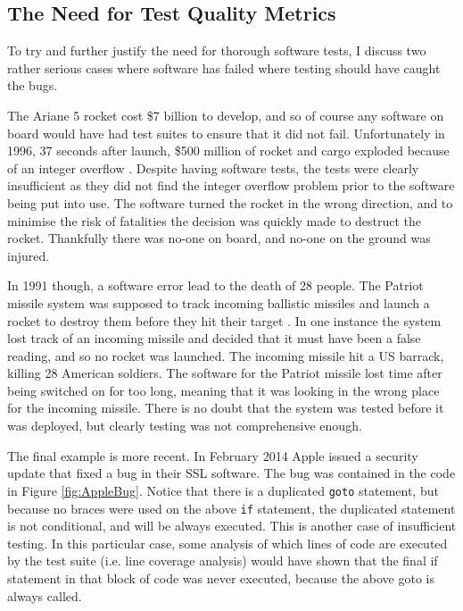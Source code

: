 \subsection{The Need for Test Quality Metrics}

To try and further justify the need for thorough software tests, I discuss two rather serious cases where software has failed where testing should have caught the bugs.

The Ariane 5 rocket cost \$7 billion to develop, and so of course any software on board would have had test suites to ensure that it did not fail. Unfortunately in 1996, 37 seconds after launch, \$500 million of rocket and cargo exploded because of an integer overflow \citep{ariane5}. Despite having software tests, the tests were clearly insufficient as they did not find the integer overflow problem prior to the software being put into use. The software turned the rocket in the wrong direction, and to minimise the risk of fatalities the decision was quickly made to destruct the rocket. Thankfully there was no-one on board, and no-one on the ground was injured.

In 1991 though, a software error lead to the death of 28 people. The Patriot missile system was supposed to track incoming ballistic missiles and launch a rocket to destroy them before they hit their target \citep{patriotMissile}. In one instance the system lost track of an incoming missile and decided that it must have been a false reading, and so no rocket was launched. The incoming missile hit a US barrack, killing 28 American soldiers. The software for the Patriot missile lost time after being switched on for too long, meaning that it was looking in the wrong place for the incoming missile. There is no doubt that the system was tested before it was deployed, but clearly testing was not comprehensive enough. 

The final example is more recent. In February 2014 Apple issued a security update that fixed a bug in their SSL software. The bug was contained in the code in Figure \ref{fig:AppleBug}. Notice that there is a duplicated \verb|goto| statement, but because no braces were used on the above \verb|if| statement, the duplicated statement is not conditional, and will be always executed. This is another case of insufficient testing. In this particular case, some analysis of which lines of code are executed by the test suite (i.e. line coverage analysis) would have shown that the final if statement in that block of code was never executed, because the above goto is always called.

